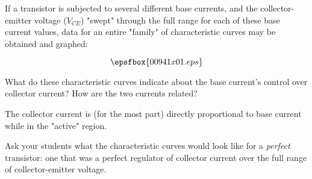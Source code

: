

If a transistor is subjected to several different base currents, and the collector-emitter voltage ($V_{CE}$) "swept" through the full range for each of these base current values, data for an entire "family" of characteristic curves may be obtained and graphed:

$$\epsfbox{00941x01.eps}$$

What do these characteristic curves indicate about the base current's control over collector current?  How are the two currents related?







The collector current is (for the most part) directly proportional to base current while in the "active" region.







Ask your students what the characteristic curves would look like for a {\it perfect} transistor: one that was a perfect regulator of collector current over the full range of collector-emitter voltage.




